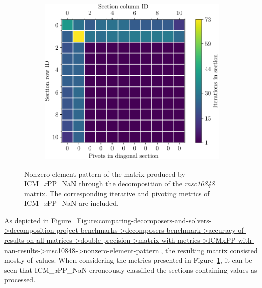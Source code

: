 \begin{figure}[ht!]
\begin{subfigure}[t]{0.51\textwidth}
		\includegraphics[width=\textwidth, keepaspectratio, clip]{images/ch03/input-matrices/decomposition-benchmarks/msc10848_icmxpp_nan_metrics.pdf}
		\label{Figure:comparing-decomposers-and-solvers->decomposition-project-benchmarks->decomposers-benchmark->accuracy-of-results-on-all-matrices->double-precision->matrix-with-metrics->ICMxPP-with-nan-results->msc10848->metrics}
	\end{subfigure}
	\caption{Nonzero element pattern of the  matrix produced by ICM\_\textit{x}PP\_NaN through the decomposition of the \textit{msc10848} matrix. The corresponding iterative and pivoting metrics of ICM\_\textit{x}PP\_NaN are included.}
	\label{Figure:comparing-decomposers-and-solvers->decomposition-project-benchmarks->decomposers-benchmark->accuracy-of-results-on-all-matrices->double-precision->matrix-with-metrics->ICMxPP-with-nan-results->msc10848}
\end{figure}

As depicted in Figure~\ref{Figure:comparing-decomposers-and-solvers->decomposition-project-benchmarks->decomposers-benchmark->accuracy-of-results-on-all-matrices->double-precision->matrix-with-metrics->ICMxPP-with-nan-results->msc10848->nonzero-element-pattern}, the resulting matrix consisted mostly of  values. When considering the metrics presented in Figure~\ref{Figure:comparing-decomposers-and-solvers->decomposition-project-benchmarks->decomposers-benchmark->accuracy-of-results-on-all-matrices->double-precision->matrix-with-metrics->ICMxPP-with-nan-results->msc10848->metrics}, it can be seen that ICM\_\textit{x}PP\_NaN erroneously classified the sections containing  values as processed.

